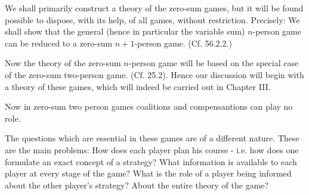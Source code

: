 We shall primarily construct a theory of the zero-sum games, but it will be found possible to dispose, with its help, of all games, without restriction. Precisely: We shall show that the general (hence in particular the variable sum) $n$-person game can be reduced to a zero-sum $n+1$-person game. (Cf. 56.2.2.) 


Now the theory of the zero-sum $n$-person game will be based on the special case of the zero-sum two-person game. (Cf. 25.2). Hence our discussion will begin with a theory of these games, which will indeed be carried out in Chapter III.

Now in zero-sum two person games coalitions and compensantions can play no role. 


The questions which are essential in these games are of a different nature. These are the main problems: How does each player plan his course - i.e. how does one formulate an exact concept of a strategy? What information is available to each player at every stage of the game? What is the role of a player being informed about the other player's strategy? About the entire theory of the game?